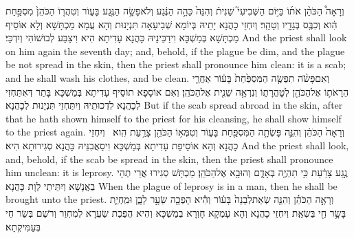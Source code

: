 {וְרָאָה֩ הַכֹּהֵ֨ן אֹת֜וֹ בַּיּ֣וֹם הַשְּׁבִיעִי֮ שֵׁנִית֒ וְהִנֵּה֙ כֵּהָ֣ה הַנֶּ֔גַע וְלֹא\maqqaf פָשָׂ֥ה הַנֶּ֖גַע בָּע֑וֹר וְטִהֲר֤וֹ הַכֹּהֵן֙ מִסְפַּ֣חַת הִ֔וא וְכִבֶּ֥ס בְּגָדָ֖יו וְטָהֵֽר׃}
{וְיִחְזֵי כָהֲנָא יָתֵיהּ בְּיוֹמָא שְׁבִיעָאָה תִּנְיָנוּת וְהָא עֲמָא מַכְתָּשָׁא וְלָא אוֹסֵיף מַכְתָּשָׁא בְּמַשְׁכָּא וִידַכֵּינֵיהּ כָּהֲנָא עָדִיתָא הִיא וִיצַבַּע לְבוּשׁוֹהִי וְיִדְכֵּי׃}
{And the priest shall look on him again the seventh day; and, behold, if the plague be dim, and the plague be not spread in the skin, then the priest shall pronounce him clean: it is a scab; and he shall wash his clothes, and be clean.}{}
{וְאִם\maqqaf פָּשֹׂ֨ה תִפְשֶׂ֤ה הַמִּסְפַּ֙חַת֙ בָּע֔וֹר אַחֲרֵ֧י הֵרָאֹת֛וֹ אֶל\maqqaf הַכֹּהֵ֖ן לְטׇהֳרָת֑וֹ וְנִרְאָ֥ה שֵׁנִ֖ית אֶל\maqqaf הַכֹּהֵֽן׃}
{וְאִם אוֹסָפָא תוֹסֵיף עָדִיתָא בְּמַשְׁכָּא בָּתַר דְּאִתַּחְזִי לְכָהֲנָא לִדְכוּתֵיהּ וְיִתַּחְזֵי תִּנְיָנוּת לְכָהֲנָא׃}
{But if the scab spread abroad in the skin, after that he hath shown himself to the priest for his cleansing, he shall show himself to the priest again.}{}
{וְרָאָה֙ הַכֹּהֵ֔ן וְהִנֵּ֛ה פָּשְׂתָ֥ה הַמִּסְפַּ֖חַת בָּע֑וֹר וְטִמְּא֥וֹ הַכֹּהֵ֖ן צָרַ֥עַת הִֽוא׃ \petucha }
{וְיִחְזֵי כָהֲנָא וְהָא אוֹסֵיפַת עָדִיתָא בְּמַשְׁכָּא וִיסַאֲבִנֵּיהּ כָּהֲנָא סְגִירוּתָא הִיא׃}
{And the priest shall look, and, behold, if the scab be spread in the skin, then the priest shall pronounce him unclean: it is leprosy.}{}
{נֶ֣גַע צָרַ֔עַת כִּ֥י תִהְיֶ֖ה בְּאָדָ֑ם וְהוּבָ֖א אֶל\maqqaf הַכֹּהֵֽן׃}
{מַכְתָּשׁ סְגִירוּ אֲרֵי תְהֵי בַאֲנָשָׁא וְיִתֵּיתֵי לְוָת כָּהֲנָא׃}
{When the plague of leprosy is in a man, then he shall be brought unto the priest.}{}
{וְרָאָ֣ה הַכֹּהֵ֗ן וְהִנֵּ֤ה שְׂאֵת\maqqaf לְבָנָה֙ בָּע֔וֹר וְהִ֕יא הָפְכָ֖ה שֵׂעָ֣ר לָבָ֑ן וּמִֽחְיַ֛ת בָּשָׂ֥ר חַ֖י בַּשְׂאֵֽת׃}
{וְיִחְזֵי כָהֲנָא וְהָא עָמְקָא חָוְרָא בְמַשְׁכָּא וְהִיא הֲפַכַת שַׂעֲרָא לְמִחְוַר וְרֹשֶׁם בְּשַׂר חַי בְּעַמִּיקְתָא׃}
